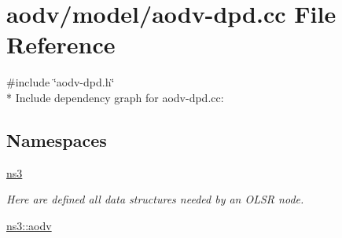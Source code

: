 \hypertarget{aodv-dpd_8cc}{}\section{aodv/model/aodv-\/dpd.cc File Reference}
\label{aodv-dpd_8cc}
{\ttfamily \#include \char`\"{}aodv-\/dpd.\+h\char`\"{}}\\*
Include dependency graph for aodv-\/dpd.cc\+:
\subsection*{Namespaces}
\begin{DoxyCompactItemize}
\item 
 \hyperlink{namespacens3}{ns3}
\begin{DoxyCompactList}\small\item\em Here are defined all data structures needed by an O\+L\+SR node. \end{DoxyCompactList}\item 
 \hyperlink{namespacens3_1_1aodv}{ns3\+::aodv}
\end{DoxyCompactItemize}
